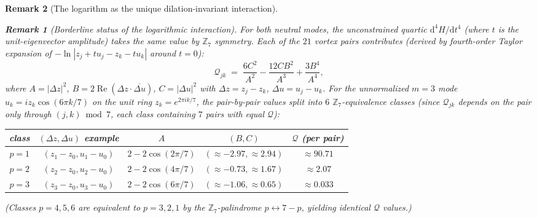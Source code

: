 \documentclass[12pt, a4paper]{article}
\newtheorem{remark}{Remark}[section]
\numberwithin{equation}{section}
\newcommand{\dd}{\mathrm{d}}
\begin{document}
\begin{remark}[The logarithm as the unique dilation-invariant interaction]
\begin{remark}[Borderline status of the logarithmic interaction]
For both neutral modes, the \emph{unconstrained} quartic
$\dd^4\!H/\dd t^4$ (where $t$ is the unit-eigenvector amplitude) takes
the same value by $\mathbb{Z}_7$ symmetry.  Each of the $21$ vortex
pairs contributes (derived by fourth-order Taylor expansion of
$-\ln|z_j + t u_j - z_k - t u_k|$ around $t = 0$):
\[
  \mathcal{Q}_{jk}
  \;=\; \frac{6C^2}{A^2} - \frac{12CB^2}{A^3} + \frac{3B^4}{A^4},
\]
where $A = |\Delta z|^2$, $B = 2\operatorname{Re}(\Delta z\cdot
\overline{\Delta u})$, $C = |\Delta u|^2$ with
$\Delta z = z_j - z_k$, $\Delta u = u_j - u_k$.  For the unnormalized
$m = 3$ mode $u_k = iz_k\cos(6\pi k/7)$ on the unit ring
$z_k = e^{2\pi ik/7}$, the pair-by-pair values split into $6$
$\mathbb{Z}_7$-equivalence classes (since $\mathcal{Q}_{jk}$ depends
on the pair only through $(j, k) \bmod 7$, each class containing
$7$ pairs with equal $\mathcal{Q}$):
\begin{center}\small
\begin{tabular}{c|c|c|c|c}
class & $(\Delta z, \Delta u)$ example & $A$ & $(B, C)$ & $\mathcal{Q}$ (per pair) \\\midrule
$p = 1$ & $(z_1{-}z_0, u_1{-}u_0)$ & $2{-}2\cos(2\pi/7)$
  & $(\approx {-}2.97, \approx 2.94)$ & $\approx 90.71$ \\
$p = 2$ & $(z_2{-}z_0, u_2{-}u_0)$ & $2{-}2\cos(4\pi/7)$
  & $(\approx {-}0.73, \approx 1.67)$ & $\approx 2.07$ \\
$p = 3$ & $(z_3{-}z_0, u_3{-}u_0)$ & $2{-}2\cos(6\pi/7)$
  & $(\approx {-}1.06, \approx 0.65)$ & $\approx 0.033$
\end{tabular}
\end{center}
(Classes $p = 4, 5, 6$ are equivalent to $p = 3, 2, 1$ by the
$\mathbb{Z}_7$-palindrome $p \leftrightarrow 7-p$, yielding
identical $\mathcal{Q}$ values.)


\end{remark}
\end{remark}
\end{document}
